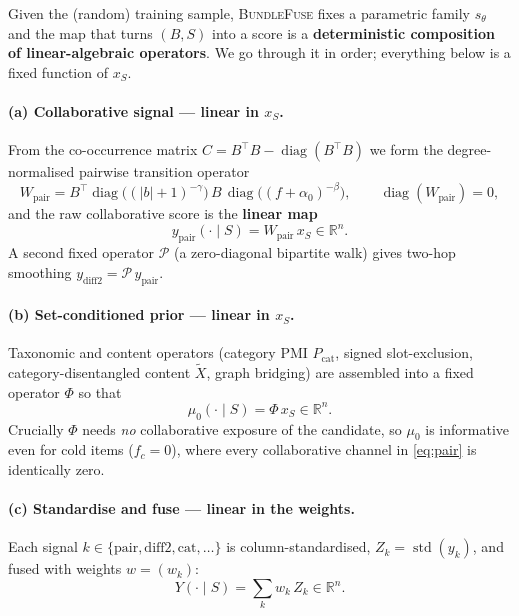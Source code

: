 \documentclass[11pt]{article}
\theoremstyle{remark}
\newcommand{\R}{\mathbb{R}}
\newcommand{\xs}{x_S}
\begin{document}
Given the (random) training sample, \textsc{BundleFuse} fixes a parametric family $s_\theta$ and the map that turns
$(B,S)$ into a score is a \textbf{deterministic composition of linear-algebraic operators}. We go through it in
order; everything below is a fixed function of $x_S$.

\paragraph{(a) Collaborative signal --- linear in $\xs$.}
From the co-occurrence matrix $C=B^{\!\top}B-\operatorname{diag}(B^{\!\top}B)$ we form the degree-normalised
pairwise transition operator
\[
  W_{\text{pair}} = B^{\!\top}\operatorname{diag}\!\big((|b|+1)^{-\gamma}\big)\,B\,
                    \operatorname{diag}\!\big((f+\alpha_0)^{-\beta}\big),
  \qquad \operatorname{diag}(W_{\text{pair}})=0,
\]
and the raw collaborative score is the \textbf{linear map}
\begin{equation}
  y_{\text{pair}}(\cdot\mid S)=W_{\text{pair}}\,\xs\in\R^n .
  \label{eq:pair}
\end{equation}
A second fixed operator $\mathcal P$ (a zero-diagonal bipartite walk) gives two-hop smoothing
$y_{\text{diff2}}=\mathcal P\,y_{\text{pair}}$.

\paragraph{(b) Set-conditioned prior --- linear in $\xs$.}
Taxonomic and content operators (category PMI $P_{\text{cat}}$, signed slot-exclusion, category-disentangled
content $\tilde X$, graph bridging) are assembled into a fixed operator $\Phi$ so that
\begin{equation}
  \mu_0(\cdot\mid S)=\Phi\,\xs\in\R^n .
  \label{eq:prior}
\end{equation}
Crucially $\Phi$ needs \emph{no} collaborative exposure of the candidate, so $\mu_0$ is informative even for cold
items ($f_c=0$), where every collaborative channel in \eqref{eq:pair} is identically zero.

\paragraph{(c) Standardise and fuse --- linear in the weights.}
Each signal $k\in\{\text{pair},\text{diff2},\text{cat},\dots\}$ is column-standardised, $Z_k=\operatorname{std}(y_k)$,
and fused with weights $w=(w_k)$:
\begin{equation}
  Y(\cdot\mid S)=\sum_k w_k\,Z_k \in\R^n .
  \label{eq:fuse}
\end{equation}
\end{document}
